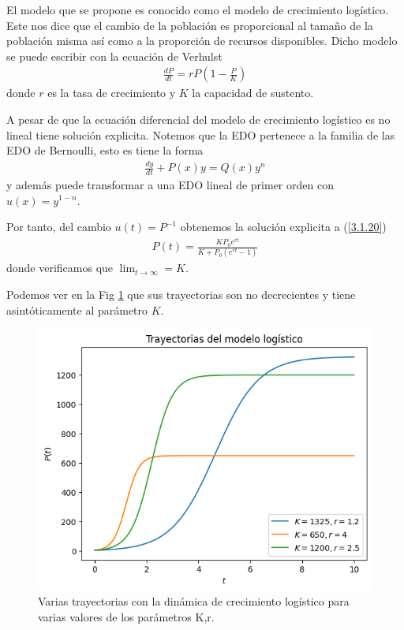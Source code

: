 El modelo que se propone es conocido como el modelo de crecimiento logístico. Este nos dice que el cambio de la población es proporcional al tamaño de la población misma así como a la proporción de recursos disponibles. Dicho modelo se puede escribir con la ecuación de Verhulst 
\begin{align}
    \frac{dP}{dt} = rP\left(1- \frac{P}{K}  \right)
\end{align}
donde $r$ es la tasa de crecimiento y $K$ la capacidad de sustento.

A pesar de que la ecuación diferencial del modelo de crecimiento logístico es no lineal tiene solución explicita. Notemos que la EDO pertenece a la familia de las EDO de Bernoulli, esto es tiene la forma
\begin{align*}
    \frac{dy}{dt} + P(x) y =Q(x) y^n
\end{align*}
y además puede transformar a una EDO lineal de primer orden con $u(x) = y ^{1-n}$.

Por tanto, del cambio $u(t) = P^{-1}$ obtenemos la solución explicita a (\ref{3.1.20})
\begin{align}
    P(t) = \frac{KP_0 e^{rt}}{K + P_0 \left(e^{rt}-1\right)}    
\end{align}
donde verificamos que $\lim_{t \rightarrow \infty} = K $. 

Podemos ver en la Fig \ref{fig:trayectoria_logistico} que sus trayectorias son no decrecientes y tiene asintóticamente al parámetro $K$.


\begin{figure}
    \centering
    \includegraphics[width = 10 cm]{img/trayectoria_log.png}
    \caption{Varias trayectorias con la dinámica de crecimiento logístico para varias valores de los parámetros K,r.}
    \label{fig:trayectoria_logistico}
\end{figure}



